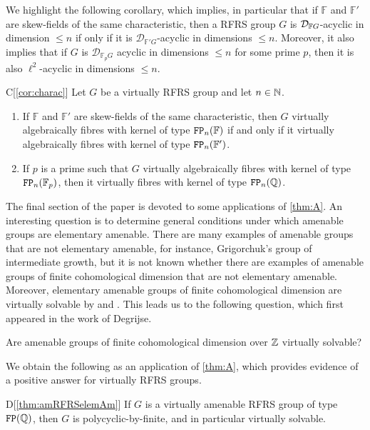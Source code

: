 \documentclass[11pt, letterpaper]{amsart}
\begin{document}
We highlight the following corollary, which implies, in particular that if $\mathbb F$ and $\mathbb F'$ are skew-fields of the same characteristic, then a RFRS group $G$ is $\mathcal{D}_{\mathbb F{G}}$-acyclic in dimension $\leqslant n$ if only if it is $\mathcal D_{\mathbb F'G}$-acyclic in dimensions $\leqslant n$. Moreover, it also implies that if $G$ is $\mathcal D_{\mathbb F_p G}$ acyclic in dimensions $\leqslant n$ for some prime $p$, then it is also $\ell^2$-acyclic in dimensions $\leqslant n$.

\begin{manualcor}{C}[\cref{cor:charac}]
    Let $G$ be a virtually RFRS group and let $n \in \mathbb{N}$.
    \begin{enumerate}
        \item If $\mathbb F$ and $\mathbb F'$ are skew-fields of the same characteristic, then $G$ virtually algebraically fibres with kernel of type $\mathtt{FP}_n(\mathbb F)$ if and only if it virtually algebraically fibres with kernel of type $\mathtt{FP}_n(\mathbb F')$.
        \item If $p$ is a prime such that $G$ virtually algebraically fibres with kernel of type $\mathtt{FP}_n(\mathbb F_p)$, then it virtually fibres with kernel of type $\mathtt{FP}_n(\mathbb{Q})$.
    \end{enumerate}
\end{manualcor}

The final section of the paper is devoted to some applications of \cref{thm:A}. An interesting question is to determine general conditions under which amenable groups are elementary amenable. There are many examples of amenable groups that are not elementary amenable, for instance, Grigorchuk's group of intermediate growth, but it is not known whether there are examples of amenable groups of finite cohomological dimension that are not elementary amenable. Moreover, elementary amenable groups of finite cohomological dimension are virtually solvable by \cite[Lemma 2]{Hillman91} and \cite[Corollary 1]{HillmanLinnell}. This leads us to the following question, which first appeared in the work of Degrijse.

\begin{q}
Are amenable groups of finite cohomological dimension over $\mathbb{Z}$ virtually solvable?
\end{q}

We obtain the following as an application of \cref{thm:A}, which provides evidence of a positive answer for virtually RFRS groups.

\begin{manualtheorem}{D}[\cref{thm:amRFRSelemAm}]\label{thm:C}
\sloppy If $G$ is a virtually amenable RFRS group of type $\mathtt{FP}(\mathbb{Q})$, then $G$ is polycyclic-by-finite, and in particular virtually solvable.
\end{manualtheorem}
\end{document}
